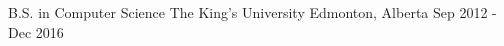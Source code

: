 
\begin{cventries}
  \cventry
    {B.S. in Computer Science} %
    {The King's University} %
    {Edmonton, Alberta} %
    {Sep 2012 - Dec 2016} %
    {}
\end{cventries}